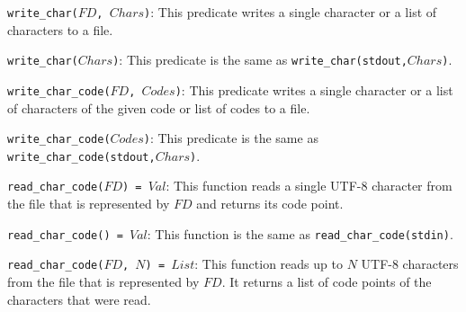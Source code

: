\item \texttt{write\_char($FD$, $Chars$)}: This predicate writes a single character or a list of characters to a file.
\item \texttt{write\_char($Chars$)}: This predicate is the same as \texttt{write\_char(stdout,$Chars$)}.


\item \texttt{write\_char\_code($FD$, $Codes$)}: This predicate writes a single character or a list of characters of the given code or list of codes to a file.
\item \texttt{write\_char\_code($Codes$)}: This predicate is the same as \texttt{write\_char\_code(stdout,$Chars$)}.



\item \texttt{read\_char\_code($FD$) = $Val$}: This function reads a single UTF-8 character from the file that is represented by $FD$ and returns its code point.
\item \texttt{read\_char\_code() = $Val$}: This function is the same as \texttt{read\_char\_code(stdin)}.
\item \texttt{read\_char\_code($FD$, $N$) = $List$}: This function reads up to $N$ UTF-8 characters from the file that is represented by $FD$.  It returns a list of code points of the characters that were read.


